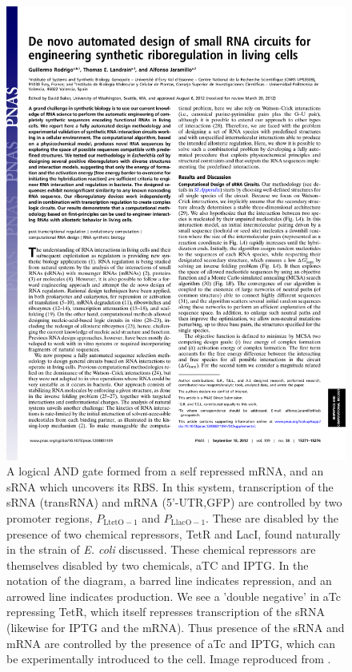 \documentclass[10pt,journal]{./IEEE_latex_class/IEEEtran}
\begin{document}
\begin{figure}[t]
\centering
\includegraphics[trim = 30 600 30 0,page=4,clip = true]{pnas1203831109.pdf}
\caption{A logical AND gate formed from a self repressed mRNA, and an sRNA which uncovers its RBS. In this system, transcription of the sRNA (transRNA) and mRNA (5'-UTR,GFP) are controlled by two promoter regions, $P_{\mathrm{LtetO-1}}$ and $P_\mathrm{LlacO-1}$. These are disabled by the presence of two chemical repressors, TetR and LacI, found naturally in the strain of \textit{E. coli} discussed. These chemical repressors are themselves disabled by two chemicals, aTC and IPTG. In the notation of the diagram, a barred line indicates repression, and an arrowed line indicates production. We see a 'double negative' in aTc repressing TetR, which itself represses transcription of the sRNA (likewise for IPTG and the mRNA). Thus presence of the sRNA and mRNA are controlled by the presence of aTc and IPTG, which can be experimentally introduced to the cell.  Image reproduced from \cite{Rodrigo2012}.}
\label{ANDGate}
\end{figure}
\end{document}
